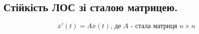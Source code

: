 \subsection{Стійкість ЛОС зі сталою матрицею.}

\begin{equation}
\overline{x} ' (t) = A \overline{x} (t) \text{, де $A$ - стала матриця $n \times n$}
\end{equation}
\begin{boxteo}

\end{boxteo}
